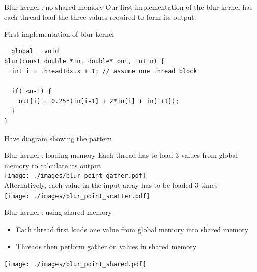 \begin{frame}[fragile]{Blur kernel : no shared memory}
    Our first implementation of the blur kernel has each thread load the three values required to form its output:
    \begin{code}{First implementation of blur kernel}
        \begin{lstlisting}[style=boxcudatiny]
__global__ void
blur(const double *in, double* out, int n) {
  int i = threadIdx.x + 1; // assume one thread block

  if(i<n-1) {
    out[i] = 0.25*(in[i-1] + 2*in[i] + in[i+1]);
  }
}
        \end{lstlisting}
    \end{code}

    Have diagram showing the pattern

\end{frame}

\begin{frame}[fragile]{Blur kernel : loading memory}
    \centering
    Each thread has to load 3 values from global memory to calculate its output \\
    \texttt{[image: ./images/blur\_point\_gather.pdf]} \\
    Alternatively, each value in the input array has to be loaded 3 times \\
    \texttt{[image: ./images/blur\_point\_scatter.pdf]} \\
\end{frame}

\begin{frame}[fragile]{Blur kernel : using shared memory}
    \begin{itemize}
        \item Each thread first loads one value from global memory into shared memory
        \item Threads then perform gather on values in shared memory
    \end{itemize}
    \begin{center}
        \texttt{[image: ./images/blur\_point\_shared.pdf]}
    \end{center}
\end{frame}


